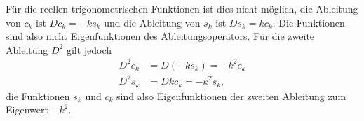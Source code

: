 Für die reellen trigonometrischen Funktionen ist dies nicht möglich,
die Ableitung von $c_k$ ist $Dc_k=-ks_k$ und
die Ableitung von $s_k$ ist $Ds_k=kc_k$.
Die Funktionen sind also nicht Eigenfunktionen des Ableitungsoperators.
Für die zweite Ableitung $D^2$ gilt jedoch
\begin{align*}
D^2c_k &= D(-ks_k) = -k^2c_k
\\
D^2s_k &= Dkc_k = -k^2s_k,
\end{align*}
die Funktionen $s_k$ und $c_k$ sind also Eigenfunktionen der zweiten
Ableitung zum Eigenwert $-k^2$.




